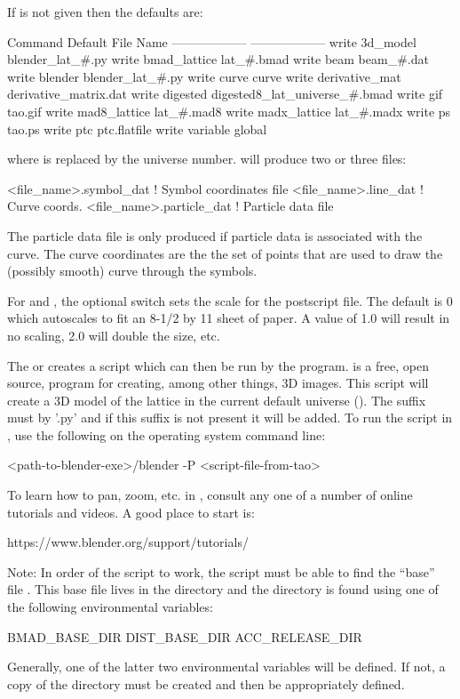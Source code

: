 {{{If  is not given then the defaults are:
\begin{example}
  Command                        Default File Name
  ------------------             ------------------
  write 3d_model                 blender_lat_#.py
  write bmad_lattice             lat_#.bmad
  write beam                     beam_#.dat
  write blender                  blender_lat_#.py
  write curve                    curve
  write derivative_mat           derivative_matrix.dat              
  write digested                 digested8_lat_universe_#.bmad
  write gif                      tao.gif
  write mad8_lattice             lat_#.mad8
  write madx_lattice             lat_#.madx
  write ps                       tao.ps
  write ptc                      ptc.flatfile
  write variable                 global%
\end{example}
where \vn{\#} is replaced by the universe number.  will produce two or three files: 
\begin{example}
  <file_name>.symbol_dat    ! Symbol coordinates file
  <file_name>.line_dat      ! Curve coords.
  <file_name>.particle_dat  ! Particle data file
\end{example}
The particle data file is only produced if particle
data is associated with the curve.
The curve coordinates are the the set of points that are used to draw the
(possibly smooth) curve through the symbols.

For  and , the optional  switch sets the
scale for the postscript file. The default is 0 which autoscales to fit an
8-1/2 by 11 sheet of paper. A value of 1.0 will result in no scaling,
2.0 will double the size, etc.

The  or  creates a script which
can then be run by the  program\cite{b:blender}.
 is a free, open source, program for creating, among other
things, 3D images. This script will create a 3D model of the lattice
in the current default universe (). The suffix must
by '.py' and if this suffix is not present it will be added. To run
the script in , use the following on the operating system
command line:
\begin{example}
  <path-to-blender-exe>/blender -P <script-file-from-tao>
\end{example}
To learn how to pan, zoom, etc. in , consult any one of
a number of online tutorials and videos. A good place to start is:
\begin{example}
  https://www.blender.org/support/tutorials/  
\end{example}
Note: In order of the script to work, the script must be able to find
the ``base'' file . This base file
lives in the  directory and the  directory
is found using one of the following environmental variables:
\begin{example}
  BMAD_BASE_DIR
  DIST_BASE_DIR
  ACC_RELEASE_DIR
\end{example}
Generally, one of the latter two environmental variables will be
defined.  If not, a copy of the \bmad directory must be created and
then  be appropriately defined.

}}}
